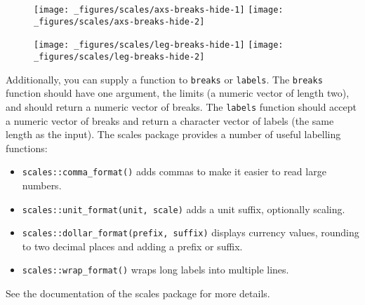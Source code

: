 \begin{figure}[H]
  \texttt{[image: \_figures/scales/axs-breaks-hide-1]}%
  \texttt{[image: \_figures/scales/axs-breaks-hide-2]}
\end{figure}

\begin{Shaded}
\begin{Highlighting}[]
\OperatorTok{+}\StringTok{ }\NormalTok{(} \NormalTok{)}
\OperatorTok{+}\StringTok{ }\NormalTok{(} \NormalTok{)}
\end{Highlighting}
\end{Shaded}

\begin{figure}[H]
  \texttt{[image: \_figures/scales/leg-breaks-hide-1]}%
  \texttt{[image: \_figures/scales/leg-breaks-hide-2]}
\end{figure}

Additionally, you can supply a function to \texttt{breaks} or
\texttt{labels}. The \texttt{breaks} function should have one argument,
the limits (a numeric vector of length two), and should return a numeric
vector of breaks. The \texttt{labels} function should accept a numeric
vector of breaks and return a character vector of labels (the same
length as the input). The scales package provides a number of useful
labelling functions:

\begin{itemize}
\item
  \texttt{scales::comma\_format()} adds commas to make it easier to read
  large numbers.
\item
  \texttt{scales::unit\_format(unit,\ scale)} adds a unit suffix,
  optionally scaling.
\item
  \texttt{scales::dollar\_format(prefix,\ suffix)} displays currency
  values, rounding to two decimal places and adding a prefix or suffix.
\item
  \texttt{scales::wrap\_format()} wraps long labels into multiple lines.
\end{itemize}

See the documentation of the scales package for more details.

\begin{Shaded}
\begin{Highlighting}[]
\OperatorTok{+}\StringTok{ }\NormalTok{(}\OperatorTok{::}\NormalTok{())}
\OperatorTok{+}\StringTok{ }\NormalTok{(}\OperatorTok{::}\NormalTok{(}\NormalTok{))}
\OperatorTok{+}\StringTok{ }\NormalTok{(}\OperatorTok{::}\NormalTok{(}\NormalTok{, }\NormalTok{))}
\end{Highlighting}
\end{Shaded}

